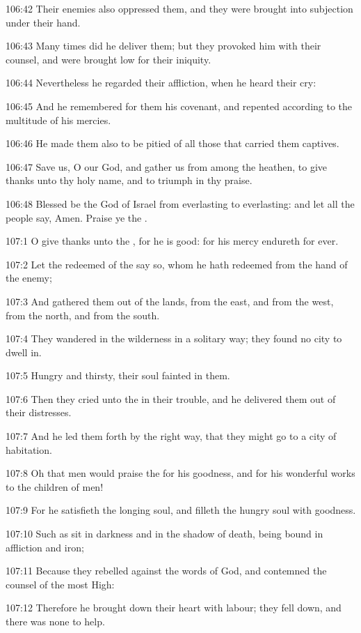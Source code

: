 106:42 Their enemies also oppressed them, and they were brought into subjection under their hand.

106:43 Many times did he deliver them; but they provoked him with their counsel, and were brought low for their iniquity.

106:44 Nevertheless he regarded their affliction, when he heard their cry:

106:45 And he remembered for them his covenant, and repented according to the multitude of his mercies.

106:46 He made them also to be pitied of all those that carried them captives.

106:47 Save us, O \LORD our God, and gather us from among the heathen, to give thanks unto thy holy name, and to triumph in thy praise.

106:48 Blessed be the \LORD God of Israel from everlasting to everlasting: and let all the people say, Amen. Praise ye the \LORD.



107:1 O give thanks unto the \LORD, for he is good: for his mercy endureth for ever.

107:2 Let the redeemed of the \LORD say so, whom he hath redeemed from the hand of the enemy;

107:3 And gathered them out of the lands, from the east, and from the west, from the north, and from the south.

107:4 They wandered in the wilderness in a solitary way; they found no city to dwell in.

107:5 Hungry and thirsty, their soul fainted in them.

107:6 Then they cried unto the \LORD in their trouble, and he delivered them out of their distresses.

107:7 And he led them forth by the right way, that they might go to a city of habitation.

107:8 Oh that men would praise the \LORD for his goodness, and for his wonderful works to the children of men!

107:9 For he satisfieth the longing soul, and filleth the hungry soul with goodness.

107:10 Such as sit in darkness and in the shadow of death, being bound in affliction and iron;

107:11 Because they rebelled against the words of God, and contemned the counsel of the most High:

107:12 Therefore he brought down their heart with labour; they fell down, and there was none to help.

